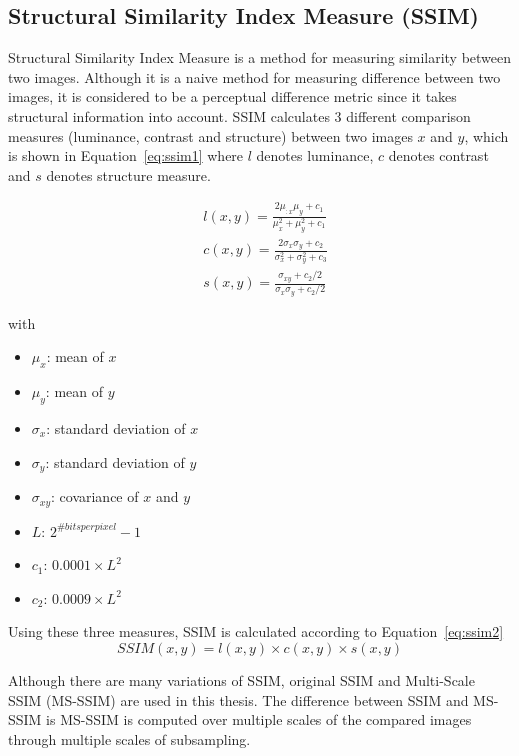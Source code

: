 \subsection{Structural Similarity Index Measure (SSIM)}
Structural Similarity Index Measure is a method for measuring similarity between two images. Although it is a naive method for measuring difference between two images, it is considered to be a perceptual difference metric since it takes structural information into account. SSIM calculates 3 different comparison measures (luminance, contrast and structure) between two images $x$ and $y$, which is shown in Equation~\ref{eq:ssim1} where $l$ denotes luminance, $c$ denotes contrast and $s$ denotes structure measure.

\begin{equation}
    \label{eq:ssim1}
    \begin{aligned}
         & l(x, y)=\frac{2 \mu_{: x} \mu_{y}+c_{1}}{\mu_{x}^{2}+\mu_{y}^{2}+c_{1}}           \\
         & c(x, y)=\frac{2 \sigma_{x} \sigma_{y}+c_{2}}{\sigma_{x}^{2}+\sigma_{y}^{2}+c_{3}} \\
         & s(x, y)=\frac{\sigma_{x y}+c_{2}/2}{\sigma_{x} \sigma_{y}+c_{2}/2}
    \end{aligned}
\end{equation}

with
\begin{itemize}
    \setlength\itemsep{0em}
    \item \(\mu_x\): mean of \(x\)
    \item \(\mu_y\): mean of \(y\)
    \item \(\sigma_x\): standard deviation of \(x\)
    \item \(\sigma_y\): standard deviation of \(y\)
    \item \(\sigma_{xy}\): covariance of \(x\) and \(y\)
    \item \(L\): \(2^{\#bits per pixel}-1\)
    \item \(c_1\): \(0.0001 \times L^2\)
    \item \(c_2\): \(0.0009 \times L^2\)
\end{itemize}

Using these three measures, SSIM is calculated according to Equation~\ref{eq:ssim2}
\begin{equation}
    \label{eq:ssim2}
    SSIM(x,y) = l(x,y) \times c(x,y) \times s(x,y)
\end{equation}

Although there are many variations of SSIM, original SSIM and Multi-Scale SSIM (MS-SSIM) are used in this thesis. The difference between SSIM and MS-SSIM is MS-SSIM is computed over multiple scales of the compared images through multiple scales of subsampling.

